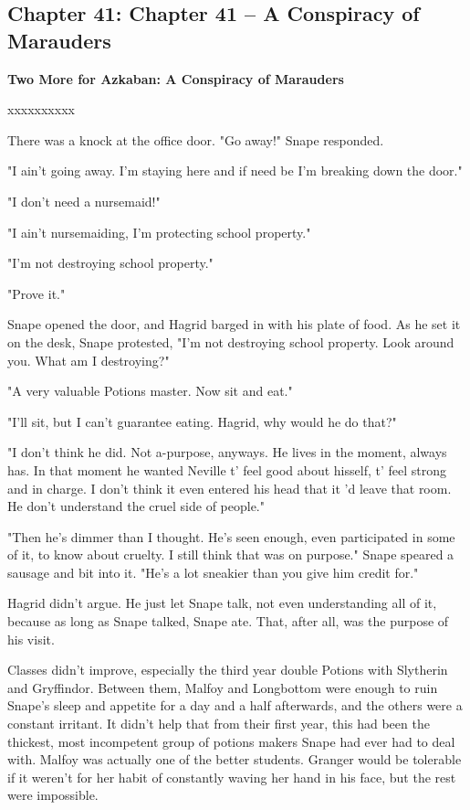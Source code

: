 \documentclass[a4paper,11pt]{article}
\begin{document}
\subsection{Chapter 41: Chapter 41 – A Conspiracy of Marauders}

\textbf{Two More for Azkaban: A Conspiracy of Marauders}

xxxxxxxxxx

There was a knock at the office door. "Go away!" Snape responded.

"I ain't going away. I'm staying here and if need be I'm breaking down the door."

"I don't need a nursemaid!"

"I ain't nursemaiding, I'm protecting school property."

"I'm not destroying school property."

"Prove it."

Snape opened the door, and Hagrid barged in with his plate of food. As he set it on the desk, Snape protested, "I'm not destroying school property. Look around you. What am I destroying?"

"A very valuable Potions master. Now sit and eat."

"I'll sit, but I can't guarantee eating. Hagrid, why would he do that?"

"I don't think he did. Not a-purpose, anyways. He lives in the moment, always has. In that moment he wanted Neville t' feel good about hisself, t' feel strong and in charge. I don't think it even entered his head that it 'd leave that room. He don't understand the cruel side of people."

"Then he's dimmer than I thought. He's seen enough, even participated in some of it, to know about cruelty. I still think that was on purpose." Snape speared a sausage and bit into it. "He's a lot sneakier than you give him credit for."

Hagrid didn't argue. He just let Snape talk, not even understanding all of it, because as long as Snape talked, Snape ate. That, after all, was the purpose of his visit.

Classes didn't improve, especially the third year double Potions with Slytherin and Gryffindor. Between them, Malfoy and Longbottom were enough to ruin Snape's sleep and appetite for a day and a half afterwards, and the others were a constant irritant. It didn't help that from their first year, this had been the thickest, most incompetent group of potions makers Snape had ever had to deal with. Malfoy was actually one of the better students. Granger would be tolerable if it weren't for her habit of constantly waving her hand in his face, but the rest were impossible.
\end{document}
